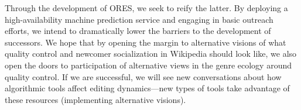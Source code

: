 Through the development of ORES, we seek to reify the latter.  By deploying a high-availability machine prediction service and engaging in basic outreach efforts, we intend to dramatically lower the barriers to the development of successors.  We hope that by opening the margin to alternative visions of what quality control and newcomer socialization in Wikipedia should look like, we also open the doors to participation of alternative views in the genre ecology around quality control.  If we are successful, we will see new conversations about how algorithmic tools affect editing dynamics---new types of tools take advantage of these resources (implementing alternative visions).
